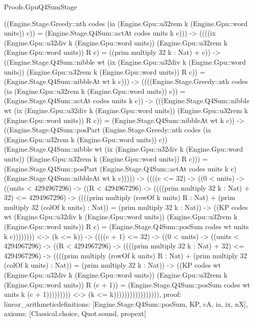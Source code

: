 \begin{lexlean}{Proofs.GpuQ4SumStage}
\begin{semanticmodule}
{((Engine.Stage.Greedy::nth codes (ia (Engine.Gpu::u32rem k (Engine.Gpu::word units)) c)) = (Engine.Stage.Q4Sum::actAt codes units k c))) -> ((((ix (Engine.Gpu::u32div k (Engine.Gpu::word units)) (Engine.Gpu::u32rem k (Engine.Gpu::word units)) R c) = ((prim multiply 32 k : Nat) + c)) -> ((Engine.Stage.Q4Sum::nibble wt (ix (Engine.Gpu::u32div k (Engine.Gpu::word units)) (Engine.Gpu::u32rem k (Engine.Gpu::word units)) R c)) = (Engine.Stage.Q4Sum::nibbleAt wt k c))) -> ((((Engine.Stage.Greedy::nth codes (ia (Engine.Gpu::u32rem k (Engine.Gpu::word units)) c)) = (Engine.Stage.Q4Sum::actAt codes units k c)) -> (((Engine.Stage.Q4Sum::nibble wt (ix (Engine.Gpu::u32div k (Engine.Gpu::word units)) (Engine.Gpu::u32rem k (Engine.Gpu::word units)) R c)) = (Engine.Stage.Q4Sum::nibbleAt wt k c)) -> ((Engine.Stage.Q4Sum::posPart (Engine.Stage.Greedy::nth codes (ia (Engine.Gpu::u32rem k (Engine.Gpu::word units)) c)) (Engine.Stage.Q4Sum::nibble wt (ix (Engine.Gpu::u32div k (Engine.Gpu::word units)) (Engine.Gpu::u32rem k (Engine.Gpu::word units)) R c))) = (Engine.Stage.Q4Sum::posPart (Engine.Stage.Q4Sum::actAt codes units k c) (Engine.Stage.Q4Sum::nibbleAt wt k c))))) -> ((((c <= 32) -> ((0 < units) -> ((units < 4294967296) -> ((R < 4294967296) -> ((((prim multiply 32 k : Nat) + 32) <= 4294967296) -> ((((prim multiply (rowOf k units) R : Nat) + (prim multiply 32 (colOf k units) : Nat)) = (prim multiply 32 k : Nat)) -> ((KP codes wt (Engine.Gpu::u32div k (Engine.Gpu::word units)) (Engine.Gpu::u32rem k (Engine.Gpu::word units)) R c) = (Engine.Stage.Q4Sum::posSum codes wt units k c)))))))) <-> (k <= k)) -> ((((c + 1) <= 32) -> ((0 < units) -> ((units < 4294967296) -> ((R < 4294967296) -> ((((prim multiply 32 k : Nat) + 32) <= 4294967296) -> ((((prim multiply (rowOf k units) R : Nat) + (prim multiply 32 (colOf k units) : Nat)) = (prim multiply 32 k : Nat)) -> ((KP codes wt (Engine.Gpu::u32div k (Engine.Gpu::word units)) (Engine.Gpu::u32rem k (Engine.Gpu::word units)) R (c + 1)) = (Engine.Stage.Q4Sum::posSum codes wt units k (c + 1))))))))) <-> (k <= k))))))))))))))))),
  proof: linear_arithmetic{definitions: [Engine.Stage.Q4Sum::posSum, KP, cA, ia, ix, nX]},
  axioms: [Classical.choice, Quot.sound, propext]
}


\end{semanticmodule}
\end{lexlean}
